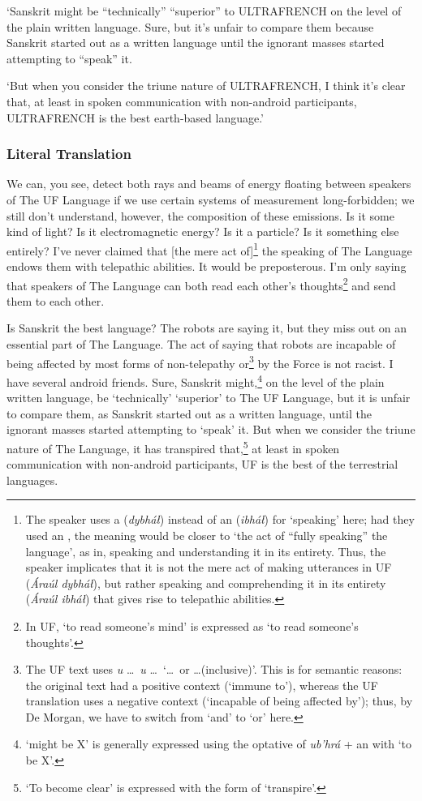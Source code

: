\documentclass[a4paper, 12pt, twoside, final]{article}
\let \w \textit
\begin{document}
‘Sanskrit might be “technically” “superior” to ULTRAFRENCH on the level of the plain written language. Sure, but it’s
unfair to compare them because Sanskrit started out as a written language until the ignorant masses started attempting
to “speak” it.

‘But when you consider the triune nature of ULTRAFRENCH, I think it’s clear that, at least in spoken communication with
non-android participants, ULTRAFRENCH is the best earth-based language.’

\subsubsection{Literal Translation}
We can, you see, detect both rays and beams of energy floating between speakers of The UF Language
if we use certain systems of measurement long-forbidden; we still don’t understand, however, the composition of these
emissions. Is it some kind of light? Is it electromagnetic energy? Is it a particle? Is it something else entirely?
I’ve never claimed that [the mere act of]\footnote{The speaker uses a  (\w{dybháł}) instead of an 
(\w{ibháł}) for ‘speaking’ here; had they used an , the meaning would be closer to ‘the act
of “fully speaking” the language’, as in, speaking and understanding it in its entirety. Thus, the speaker implicates that
it is not the mere act of making utterances in UF (\w{Áraúl dybháł}), but rather speaking and comprehending it in its entirety (\w{Áraúl ibháł})
that gives rise to telepathic abilities.} the speaking of The Language endows them with telepathic abilities.
It would be preposterous. I’m only saying that speakers of The Language can both read each other’s thoughts\footnote{In UF, ‘to
read someone’s mind’ is expressed as ‘to read someone’s thoughts’.} and send them to each other.

Is Sanskrit the best language? The robots are saying it, but they miss out on an essential part of The Language. The act
of saying that robots are incapable of being affected by most forms of non-telepathy or\footnote{The UF text uses \w{u} \ldots\ \w{u}
\ldots\ ‘\ldots\ or \ldots (inclusive)’. This is for semantic reasons: the original text had a positive context (‘immune to’), whereas
the UF translation uses a negative context (‘incapable of being affected by’); thus, by De Morgan, we have to switch from ‘and’
to ‘or’ here.} by the Force is not racist. I have several android friends. Sure, Sanskrit might,\footnote{‘might be X’ is
generally expressed using the optative of \w{ub’hrá} + an  with ‘to be X’.} on the level of the plain written
language, be ‘technically’ ‘superior’ to The UF Language, but it is unfair to compare them, as Sanskrit started out as
a written language, until the ignorant masses started attempting to ‘speak’ it. But when we consider the triune nature
of The Language, it has transpired that,\footnote{‘To become clear’ is expressed with the  form of ‘transpire’.}
at least in spoken communication with non-android participants, UF is the best of the terrestrial languages.
\end{document}
